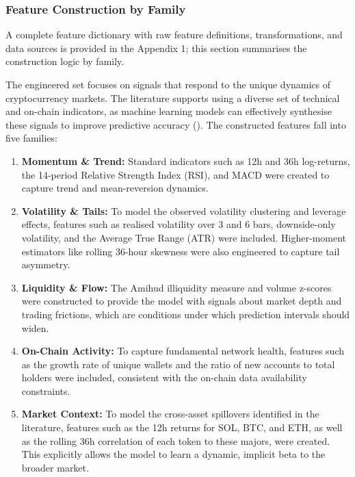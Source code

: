 \documentclass[
  a4paper,
  DIV=11,
  numbers=noendperiod]{scrreprt}
\providecommand{\tightlist}{%
  \setlength{\itemsep}{0pt}\setlength{\parskip}{0pt}}
\begin{document}
\subsubsection{Feature Construction by
Family}\label{feature-construction-by-family}

A complete feature dictionary with raw feature definitions,
transformations, and data sources is provided in the Appendix 1; this
section summarises the construction logic by family.

The engineered set focuses on signals that respond to the unique
dynamics of cryptocurrency markets. The literature supports using a
diverse set of technical and on-chain indicators, as machine learning
models can effectively synthesise these signals to improve predictive
accuracy (). The constructed features fall into five families:

\begin{enumerate}
\def\labelenumi{\arabic{enumi}.}
\tightlist
\item
  \textbf{Momentum \& Trend:} Standard indicators such as 12h and 36h
  log-returns, the 14-period Relative Strength Index (RSI), and MACD
  were created to capture trend and mean-reversion dynamics.
\item
  \textbf{Volatility \& Tails:} To model the observed volatility
  clustering and leverage effects, features such as realised volatility
  over 3 and 6 bars, downside-only volatility, and the Average True
  Range (ATR) were included. Higher-moment estimators like rolling
  36-hour skewness were also engineered to capture tail asymmetry.
\item
  \textbf{Liquidity \& Flow:} The Amihud illiquidity measure and volume
  z-scores were constructed to provide the model with signals about
  market depth and trading frictions, which are conditions under which
  prediction intervals should widen.
\item
  \textbf{On-Chain Activity:} To capture fundamental network health,
  features such as the growth rate of unique wallets and the ratio of
  new accounts to total holders were included, consistent with the
  on-chain data availability constraints.
\item
  \textbf{Market Context:} To model the cross-asset spillovers
  identified in the literature, features such as the 12h returns for
  SOL, BTC, and ETH, as well as the rolling 36h correlation of each
  token to these majors, were created. This explicitly allows the model
  to learn a dynamic, implicit beta to the broader market.
\end{enumerate}
\end{document}
